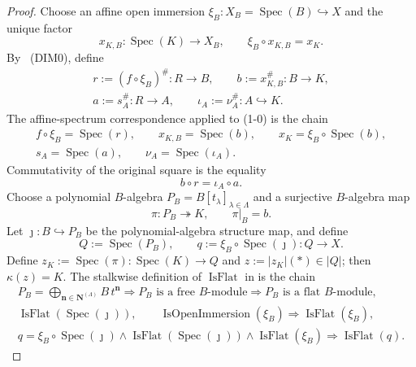\begin{proof}
  Choose an affine open immersion
  $\xi_B\colon X_B=\operatorname{Spec}(B)\hookrightarrow X$ and the unique
  factor
  \[
    x_{K,B}\colon\operatorname{Spec}(K)\to X_B,
    \qquad \xi_B\circ x_{K,B}=x_K.
  \]
  By ~(DIM0), define
  \[
  \begin{gathered}
    r:=(f\circ\xi_B)^\#\colon R\to B,
    \qquad b:=x_{K,B}^\#\colon B\to K,\\
    a:=s_A^\#\colon R\to A,
    \qquad \iota_A:=\nu_A^\#\colon A\hookrightarrow K.
  \end{gathered}                                                   \tag{1-0}
  \]
  The affine-spectrum correspondence applied to (1-0) is the chain
  \[
  \begin{gathered}
    f\circ\xi_B=\operatorname{Spec}(r),\qquad
    x_{K,B}=\operatorname{Spec}(b),\qquad
    x_K=\xi_B\circ\operatorname{Spec}(b),\\
    s_A=\operatorname{Spec}(a),\qquad
    \nu_A=\operatorname{Spec}(\iota_A).
  \end{gathered}                                                   \tag{1-0a}
  \]
  Commutativity of the original square is the equality
  \[
    b\circ r=\iota_A\circ a.                                    \tag{1}
  \]
  Choose a polynomial $B$-algebra $P_B=B[t_\lambda]_{\lambda\in\Lambda}$ and
  a surjective $B$-algebra map
  \[
    \pi\colon P_B\twoheadrightarrow K,
    \qquad \pi|_B=b.
  \]
  Let $\jmath\colon B\hookrightarrow P_B$ be the polynomial-algebra
  structure map, and define
  \[
    Q:=\operatorname{Spec}(P_B),\qquad
    q:=\xi_B\circ\operatorname{Spec}(\jmath)\colon Q\to X.
  \]
  Define $z_K:=\operatorname{Spec}(\pi)\colon\operatorname{Spec}(K)\to Q$
  and $z:=|z_K|(*)\in|Q|$; then $\kappa(z)=K$.  The stalkwise definition of
  $\operatorname{IsFlat}$ in
   is the chain
  \[
  \begin{gathered}
    P_B=\bigoplus_{\mathbf n\in\mathbf N^{(\Lambda)}}B\,t^{\mathbf n}
      \Longrightarrow P_B\text{ is a free }B\text{-module}
      \Longrightarrow P_B\text{ is a flat }B\text{-module},\\
    \operatorname{IsFlat}(\operatorname{Spec}(\jmath)),\qquad
    \operatorname{IsOpenImmersion}(\xi_B)
      \Longrightarrow\operatorname{IsFlat}(\xi_B),\\
    q=\xi_B\circ\operatorname{Spec}(\jmath)
      \wedge
      \operatorname{IsFlat}(\operatorname{Spec}(\jmath))
      \wedge
      \operatorname{IsFlat}(\xi_B)
      \Longrightarrow\operatorname{IsFlat}(q).
  \end{gathered}                                                   \tag{1b}
  \]


\end{proof}
